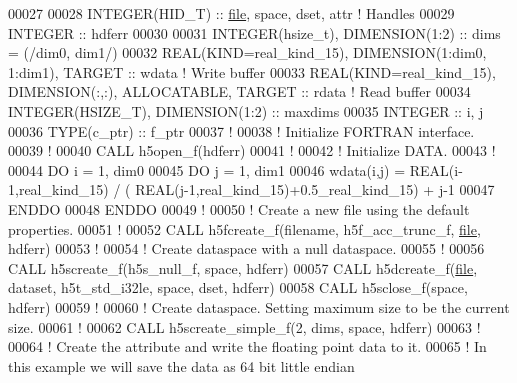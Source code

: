 \begin{DoxyCode}
00027 
00028   \textcolor{keywordtype}{INTEGER(HID\_T)}  :: \hyperlink{structfile}{file}, space, dset, attr \textcolor{comment}{! Handles}
00029   \textcolor{keywordtype}{INTEGER} :: hdferr
00030 
00031   \textcolor{keywordtype}{INTEGER(hsize\_t)},   \textcolor{keywordtype}{DIMENSION(1:2)} :: dims = (/dim0, dim1/)
00032   \textcolor{keywordtype}{REAL(KIND=real\_kind\_15)}, \textcolor{keywordtype}{DIMENSION(1:dim0, 1:dim1)}, \textcolor{keywordtype}{TARGET} :: wdata \textcolor{comment}{! Write buffer}
00033   \textcolor{keywordtype}{REAL(KIND=real\_kind\_15)}, \textcolor{keywordtype}{DIMENSION(:,:)}, \textcolor{keywordtype}{ALLOCATABLE}, \textcolor{keywordtype}{TARGET} :: rdata \textcolor{comment}{! Read buffer}
00034   \textcolor{keywordtype}{INTEGER(HSIZE\_T)}, \textcolor{keywordtype}{DIMENSION(1:2)} :: maxdims
00035   \textcolor{keywordtype}{INTEGER} :: i, j
00036   \textcolor{keywordtype}{TYPE}(c\_ptr) :: f\_ptr
00037   \textcolor{comment}{!}
00038   \textcolor{comment}{! Initialize FORTRAN interface.}
00039   \textcolor{comment}{!}
00040   \textcolor{keyword}{CALL }h5open\_f(hdferr)
00041   \textcolor{comment}{!}
00042   \textcolor{comment}{! Initialize DATA.}
00043   \textcolor{comment}{!}
00044   \textcolor{keywordflow}{DO} i = 1, dim0
00045      \textcolor{keywordflow}{DO} j = 1, dim1
00046         wdata(i,j) = \textcolor{keywordtype}{REAL(i-1,real\_kind\_15)} / ( \textcolor{keywordtype}{REAL}(j-1,real\_kind\_15)+0.5\_real\_kind\_15) + j-1
00047 \textcolor{keywordflow}{     ENDDO}
00048 \textcolor{keywordflow}{  ENDDO}
00049   \textcolor{comment}{!}
00050   \textcolor{comment}{! Create a new file using the default properties.}
00051   \textcolor{comment}{!}
00052   \textcolor{keyword}{CALL }h5fcreate\_f(filename, h5f\_acc\_trunc\_f, \hyperlink{structfile}{file}, hdferr)
00053   \textcolor{comment}{!}
00054   \textcolor{comment}{! Create dataspace with a null dataspace.}
00055   \textcolor{comment}{!}
00056   \textcolor{keyword}{CALL }h5screate\_f(h5s\_null\_f, space, hdferr)
00057   \textcolor{keyword}{CALL }h5dcreate\_f(\hyperlink{structfile}{file}, dataset, h5t\_std\_i32le, space, dset, hdferr)
00058   \textcolor{keyword}{CALL }h5sclose\_f(space, hdferr)
00059   \textcolor{comment}{!}
00060   \textcolor{comment}{! Create dataspace.  Setting maximum size to be the current size.}
00061   \textcolor{comment}{!}
00062   \textcolor{keyword}{CALL }h5screate\_simple\_f(2, dims, space, hdferr)
00063   \textcolor{comment}{!}
00064   \textcolor{comment}{! Create the attribute and write the floating point data to it.}
00065   \textcolor{comment}{! In this example we will save the data as 64 bit little endian}

\end{DoxyCode}
